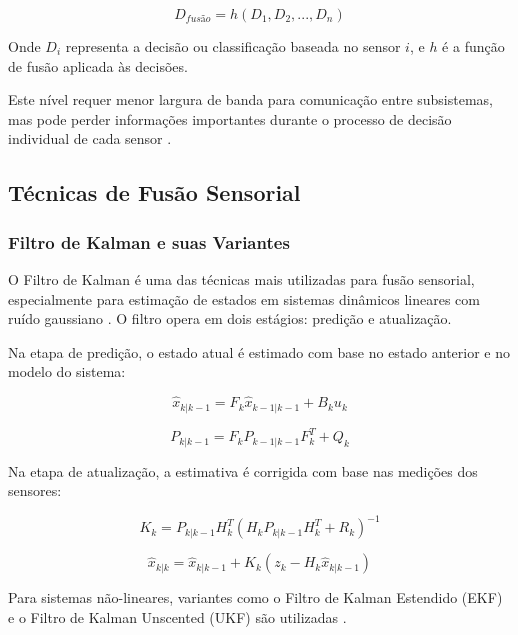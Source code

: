 \begin{equation}
D_{fusão} = h(D_1, D_2, ..., D_n)
\end{equation}

Onde $D_i$ representa a decisão ou classificação baseada no sensor $i$, e $h$ é a função de fusão aplicada às decisões.

Este nível requer menor largura de banda para comunicação entre subsistemas, mas pode perder informações importantes durante o processo de decisão individual de cada sensor \cite{Ramos2012AplicacaoTecnicas}.

\subsection{Técnicas de Fusão Sensorial}

\subsubsection{Filtro de Kalman e suas Variantes}

O Filtro de Kalman é uma das técnicas mais utilizadas para fusão sensorial, especialmente para estimação de estados em sistemas dinâmicos lineares com ruído gaussiano \cite{Oliveira2021EstudoAplicacao}. O filtro opera em dois estágios: predição e atualização.

Na etapa de predição, o estado atual é estimado com base no estado anterior e no modelo do sistema:

\begin{equation}
\hat{x}_{k|k-1} = F_k\hat{x}_{k-1|k-1} + B_ku_k
\end{equation}

\begin{equation}
P_{k|k-1} = F_kP_{k-1|k-1}F_k^T + Q_k
\end{equation}

Na etapa de atualização, a estimativa é corrigida com base nas medições dos sensores:

\begin{equation}
K_k = P_{k|k-1}H_k^T(H_kP_{k|k-1}H_k^T + R_k)^{-1}
\end{equation}

\begin{equation}
\hat{x}_{k|k} = \hat{x}_{k|k-1} + K_k(z_k - H_k\hat{x}_{k|k-1})
\end{equation}

Para sistemas não-lineares, variantes como o Filtro de Kalman Estendido (\ac{EKF}) e o Filtro de Kalman Unscented (\ac{UKF}) são utilizadas \cite{Costa2018ImplementacaoFusao}.

